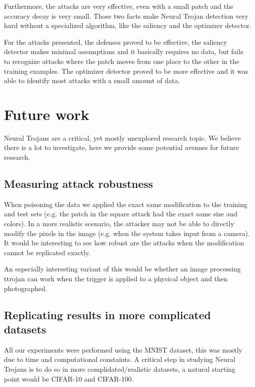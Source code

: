 \documentclass[letterpaper, 10 pt, conference]{ieeeconf}  %
\begin{document}
Furthermore, the attacks are very effective, even with a small patch and the
accuracy decay is very small. Those two facts make Neural Trojan detection
very hard without a specialized algorithm, like the saliency and the
optimizer detector.

For the attacks presented, the defenses proved to be effective, the saliency
detector makes minimal assumptions and it basically requires no data, but fails
to recognize attacks where the patch moves from one place to the other in the
training examples. The optimizer detector proved to be more effective and it
was able to identify most attacks with a small amount of data.


\section{Future work}

Neural Trojans are a critical, yet mostly unexplored research topic. We believe
there is a lot to investigate, here we provide some potential avenues for
future research.

\subsection{Measuring attack robustness}

When poisoning the data we applied the exact same modification to the training
and test sets (e.g. the patch in the square attack had the exact same size and
colors). In a more realistic scenario, the attacker may not be able to directly
modify the pixels in the image (e.g. when the system takes input from a
camera). It would be interesting to see how robust are the attacks when the
modification cannot be replicated exactly.

An especially interesting variant of this would be whether an image
processing ttrojan can work when the trigger is applied to a physical
object and then photographed.

\subsection{Replicating results in more complicated datasets}

All our experiments were performed using the MNIST dataset, this was mostly due
to time and computational constaints. A critical step in studying Neural
Trojans is to do so in more complidated/realistic datasets, a natural starting
point would be CIFAR-10 and CIFAR-100.
\end{document}
